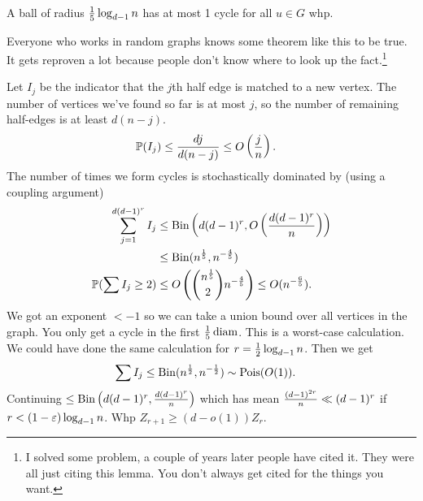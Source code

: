 \begin{lem}
A ball of radius $\frac{1}{5}\log_{d-1}n$ has at most 1 cycle for all $u\in G$ whp.
\end{lem}
Everyone who works in random graphs knows some theorem like this to be true. It gets reproven a lot because people don't know where to look up the fact.\footnote{I solved some problem, a couple of years later people have cited it. They were all just citing this lemma. You don't always get cited for the things you want.}%

Let $I_j$ be the indicator that the $j$th half edge is matched to a new vertex. The number of vertices we've found so far is at most $j$, so the number of remaining half-edges is at least $d(n-j)$. 
\begin{align}
\mathbb{P}(I_j ) &\le \frac{dj}{d(n-j)} \le O\left( {\frac{j}{n}} \right).
\end{align}
The number of times we form cycles is stochastically dominated by (using a coupling argument)
\begin{align}
\sum_{j=1}^{d(d-1)^r} I_j &\le \operatorname{Bin}\left( {d(d-1)^r, O\left( {\frac{d(d-1)^r}{n}} \right)} \right)\\
&\le \operatorname{Bin}(n^{\frac{1}{5}}, n^{-\frac{4}{5}})\\
\mathbb{P}(\sum I_j \ge 2) &\le O\left( {\binom{n^{\frac{1}{5}}}2 n^{-\frac{4}{5}}} \right)\le O(n^{-\frac{6}{5}}).
\end{align}
We got an exponent $<-1$ so we can take a union bound over all vertices in the graph.
You only get a cycle in the first $\frac{1}{5}\operatorname{diam}$. This is a worst-case calculation. We could have done the same calculation for $r=\frac{1}{2} \log_{d-1}n$. Then we get
\begin{align}
\sum I_j &\le \operatorname{Bin}(n^{\frac{1}{2}}, n^{-\frac{1}{2}})
\sim \operatorname{Pois}(O(1)).
\end{align}
Continuing %
$
\le \operatorname{Bin}\left( {d(d-1)^r, \frac{d(d-1)^r}{n}} \right)
$
which has mean $\frac{(d-1)^{2r}}{n}\ll (d-1)^r$ if $r<(1-\varepsilon)\log_{d-1}n$. Whp $Z_{r+1}\ge (d-o(1)) Z_r$. 

